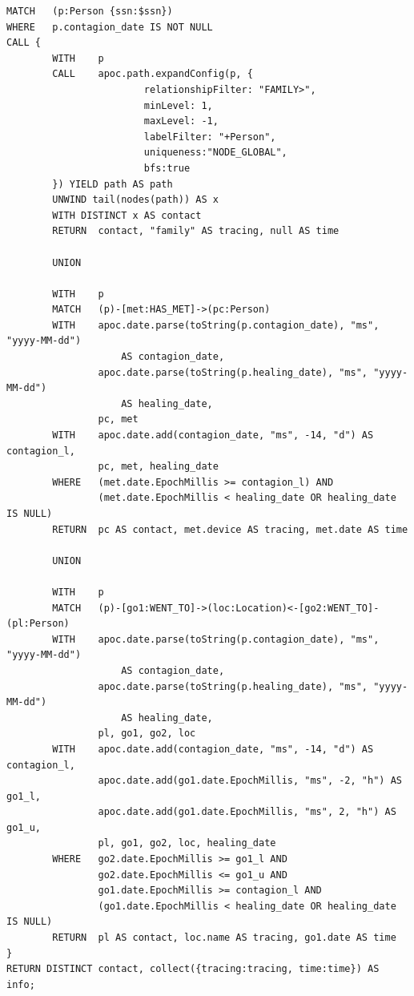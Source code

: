 \documentclass[12pt, a4paper]{article}
\begin{document}
\begin{tcolorbox}[fontupper=\scriptsize]
    \begin{verbatim}
MATCH   (p:Person {ssn:$ssn})
WHERE   p.contagion_date IS NOT NULL
CALL {
        WITH    p
        CALL    apoc.path.expandConfig(p, {
                        relationshipFilter: "FAMILY>",
                        minLevel: 1,
                        maxLevel: -1,
                        labelFilter: "+Person",
                        uniqueness:"NODE_GLOBAL",
                        bfs:true
        }) YIELD path AS path
        UNWIND tail(nodes(path)) AS x
        WITH DISTINCT x AS contact
        RETURN  contact, "family" AS tracing, null AS time

        UNION

        WITH    p
        MATCH   (p)-[met:HAS_MET]->(pc:Person)
        WITH    apoc.date.parse(toString(p.contagion_date), "ms", "yyyy-MM-dd") 
                    AS contagion_date,
                apoc.date.parse(toString(p.healing_date), "ms", "yyyy-MM-dd") 
                    AS healing_date,
                pc, met
        WITH    apoc.date.add(contagion_date, "ms", -14, "d") AS contagion_l,
                pc, met, healing_date
        WHERE   (met.date.EpochMillis >= contagion_l) AND 
                (met.date.EpochMillis < healing_date OR healing_date IS NULL)
        RETURN  pc AS contact, met.device AS tracing, met.date AS time

        UNION

        WITH    p
        MATCH   (p)-[go1:WENT_TO]->(loc:Location)<-[go2:WENT_TO]-(pl:Person)
        WITH    apoc.date.parse(toString(p.contagion_date), "ms", "yyyy-MM-dd") 
                    AS contagion_date,
                apoc.date.parse(toString(p.healing_date), "ms", "yyyy-MM-dd") 
                    AS healing_date,
                pl, go1, go2, loc
        WITH    apoc.date.add(contagion_date, "ms", -14, "d") AS contagion_l,
                apoc.date.add(go1.date.EpochMillis, "ms", -2, "h") AS go1_l,
                apoc.date.add(go1.date.EpochMillis, "ms", 2, "h") AS go1_u,
                pl, go1, go2, loc, healing_date
        WHERE   go2.date.EpochMillis >= go1_l AND 
                go2.date.EpochMillis <= go1_u AND
                go1.date.EpochMillis >= contagion_l AND 
                (go1.date.EpochMillis < healing_date OR healing_date IS NULL)
        RETURN  pl AS contact, loc.name AS tracing, go1.date AS time
}
RETURN DISTINCT contact, collect({tracing:tracing, time:time}) AS info;
    \end{verbatim}
\end{tcolorbox}
\end{document}
